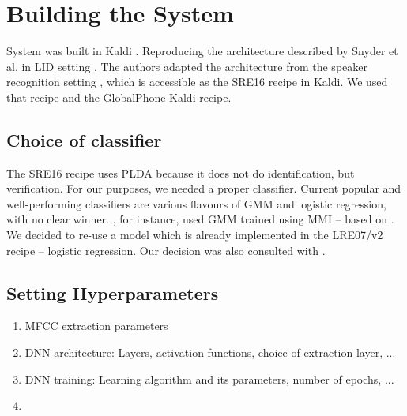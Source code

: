 \documentclass[bsc,frontabs,twoside,singlespacing,parskip,deptreport]{infthesis}
\begin{document}
\chapter{Building the System}{
  System was built in Kaldi \citep{Povey_et_al_2011}.
  Reproducing the architecture described by Snyder et al. in LID setting \citep{Snyder_et_al_2018}. The authors adapted the architecture from the speaker recognition setting \citep{Snyder_et_al_2018b}, which is accessible as the SRE16 recipe in Kaldi. We used that recipe and the GlobalPhone Kaldi recipe.
  
  \section{Choice of classifier}{
    The SRE16 recipe uses PLDA because it does not do identification, but verification. For our purposes, we needed a proper classifier. Current popular and well-performing classifiers are various flavours of GMM and logistic regression, with no clear winner. \cite{Snyder_et_al_2018}, for instance, used GMM trained using MMI -- based on \cite{McCree_2014}. We decided to re-use a model which is already implemented in the LRE07/v2 recipe -- logistic regression. Our decision was also consulted with \cite{Snyder_2018_kaldi-help}.
  }
  
  \section{Setting Hyperparameters}{
    \begin{enumerate}
    \item MFCC extraction parameters
    \item DNN architecture: Layers, activation functions, choice of extraction layer, ...
    \item DNN training: Learning algorithm and its parameters, number of epochs, ...
    \item 
    \end{enumerate}
  }
}
\end{document}

